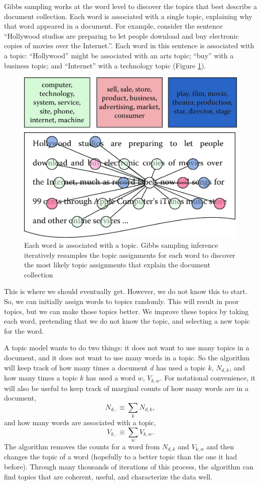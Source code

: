 \documentclass[]{krantz}
\begin{document}
Gibbs sampling works at the word level to discover the topics that best
describe a document collection. Each word is associated with a single
topic, explaining why that word appeared in a document. For example,
consider the sentence ``Hollywood studios are preparing to let people
download and buy electronic copies of movies over the Internet.''. Each
word in this sentence is associated with a topic: ``Hollywood'' might be
associated with an arts topic; ``buy'' with a business topic; and
``Internet'' with a technology topic (Figure \ref{fig:inference-1}).

\begin{figure}

{\centering \includegraphics[width=0.7\linewidth]{ChapterText/figures/inference_1} 

}

\caption{Each word is associated with a topic. Gibbs sampling inference iteratively resamples the topic assignments for each word to discover the most likely topic assignments that explain the document collection}\label{fig:inference-1}
\end{figure}

This is where we should eventually get. However, we do not know this to
start. So, we can initially assign words to topics randomly. This will
result in poor topics, but we can make those topics better. We improve
these topics by taking each word, pretending that we do not know the
topic, and selecting a new topic for the word.

A topic model wants to do two things: it does not want to use many
topics in a document, and it does not want to use many words in a topic.
So the algorithm will keep track of how many times a document \(d\) has
used a topic \(k\), \(N_{d,k}\), and how many times a topic \(k\) has
used a word \(w\), \(V_{k,w}\). For notational convenience, it will also
be useful to keep track of marginal counts of how many words are in a
document, \[N_{d, \cdot} \equiv \sum_k N_{d,k},\] and how many words are
associated with a topic, \[V_{k, \cdot} \equiv \sum_w V_{k, w}.\] The
algorithm removes the counts for a word from \(N_{d,k}\) and \(V_{k,w}\)
and then changes the topic of a word (hopefully to a better topic than
the one it had before). Through many thousands of iterations of this
process, the algorithm can find topics that are coherent, useful, and
characterize the data well.
\end{document}
